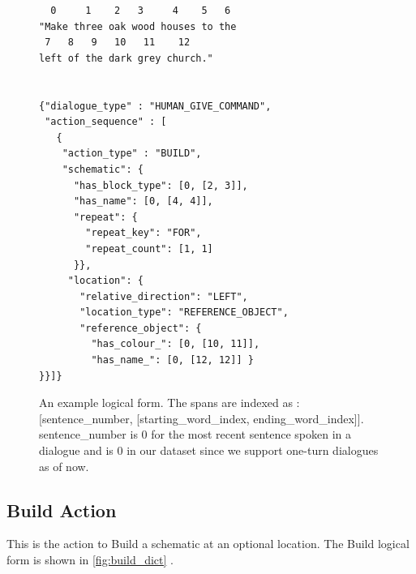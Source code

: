 \begin{figure}[ht]
    \centering
    \small
    \begin{verbatim}
  0     1    2   3     4    5   6
"Make three oak wood houses to the
 7   8   9   10   11    12
left of the dark grey church."


{"dialogue_type" : "HUMAN_GIVE_COMMAND",
 "action_sequence" : [
   {
    "action_type" : "BUILD",
    "schematic": {
      "has_block_type": [0, [2, 3]],
      "has_name": [0, [4, 4]],
      "repeat": {
        "repeat_key": "FOR",
        "repeat_count": [1, 1]
      }},
     "location": {
       "relative_direction": "LEFT",
       "location_type": "REFERENCE_OBJECT",
       "reference_object": {
         "has_colour_": [0, [10, 11]],
         "has_name_": [0, [12, 12]] }
}}]}
    \end{verbatim}
    \vspace{-20pt}
    \caption{An example logical form. The spans are indexed as : [sentence\_number, [starting\_word\_index, ending\_word\_index]].  sentence\_number is 0 for the most recent sentence spoken in a dialogue and is 0 in our dataset since we support one-turn dialogues as of now.}
    \vspace{-8pt}
    \label{fig:action_tree_ex}
\end{figure}


\subsection{ Build Action}
This is the action to Build a schematic at an optional location. The Build logical form is shown in \ref{fig:build_dict} .


